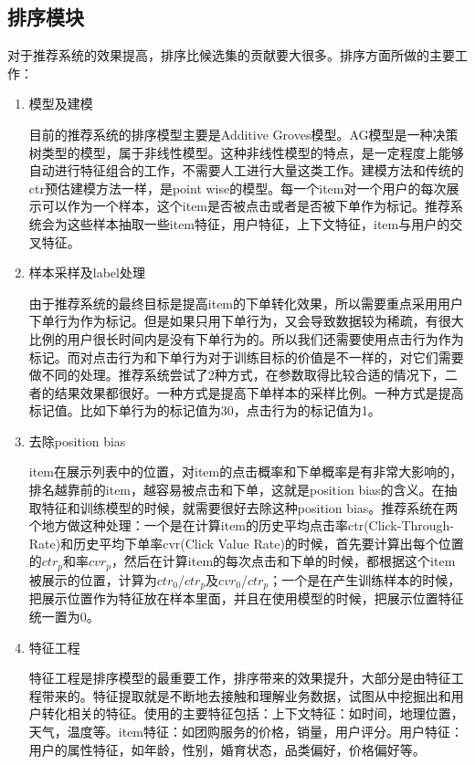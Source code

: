 		\subsection{排序模块}
		对于推荐系统的效果提高，排序比候选集的贡献要大很多。排序方面所做的主要工作：
		\begin{enumerate}[(1)]
			\item 模型及建模

			目前的推荐系统的排序模型主要是Additive Groves模型。AG模型是一种决策树类型的模型，属于非线性模型。这种非线性模型的特点，是一定程度上能够自动进行特征组合的工作，不需要人工进行大量这类工作。建模方法和传统的ctr预估建模方法一样，是point wise的模型。每一个item对一个用户的每次展示可以作为一个样本，这个item是否被点击或者是否被下单作为标记。推荐系统会为这些样本抽取一些item特征，用户特征，上下文特征，item与用户的交叉特征。
			\item 样本采样及label处理

			由于推荐系统的最终目标是提高item的下单转化效果，所以需要重点采用用户下单行为作为标记。但是如果只用下单行为，又会导致数据较为稀疏，有很大比例的用户很长时间内是没有下单行为的。所以我们还需要使用点击行为作为标记。而对点击行为和下单行为对于训练目标的价值是不一样的，对它们需要做不同的处理。推荐系统尝试了2种方式，在参数取得比较合适的情况下，二者的结果效果都很好。一种方式是提高下单样本的采样比例。一种方式是提高标记值。比如下单行为的标记值为30，点击行为的标记值为1。
			\item 去除position bias

			item在展示列表中的位置，对item的点击概率和下单概率是有非常大影响的，排名越靠前的item，越容易被点击和下单，这就是position bias的含义。在抽取特征和训练模型的时候，就需要很好去除这种position bias。推荐系统在两个地方做这种处理：一个是在计算item的历史平均点击率ctr(Click-Through-Rate)和历史平均下单率cvr(Click Value Rate)的时候，首先要计算出每个位置的$ctr_p$和率$cvr_p$，然后在计算item的每次点击和下单的时候，都根据这个item被展示的位置，计算为$ctr_0$/$ctr_p$及$cvr_0$/$ctr_p$；一个是在产生训练样本的时候，把展示位置作为特征放在样本里面，并且在使用模型的时候，把展示位置特征统一置为0。
			\item 特征工程

			特征工程是排序模型的最重要工作，排序带来的效果提升，大部分是由特征工程带来的。特征提取就是不断地去接触和理解业务数据，试图从中挖掘出和用户转化相关的特征。使用的主要特征包括：上下文特征：如时间，地理位置，天气，温度等。item特征：如团购服务的价格，销量，用户评分。用户特征：用户的属性特征，如年龄，性别，婚育状态，品类偏好，价格偏好等。
		\end{enumerate}

